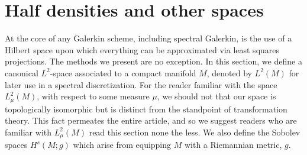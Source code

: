 \documentclass[final,leqno]{siamart}
\begin{document}


\section{Half densities and other spaces}
\label{sec:half densities}

At the core of any Galerkin scheme, including spectral Galerkin, is the use of a Hilbert space upon which everything can be approximated via least squares projections.
The methods we present are no exception.
In this section, we define a canonical $L^{2}$-space associated to a compact manifold $M$, denoted by $L^{2}(M)$ for later use in a spectral discretization.
For the reader familiar with the space $L^{2}_{\mu}(M)$, with respect to some measure $\mu$, we should not that our space is topologically isomorphic
but is distinct from the standpoint of transformation theory.  This fact permeates the entire article, and so we suggest readers who are familiar with $L^{2}_{\mu}(M)$ read this section none the less.
We also define the Sobolev spaces $H^{s}(M ; g)$ which arise from equipping $M$ with a Riemannian metric, $g$.
\end{document}
